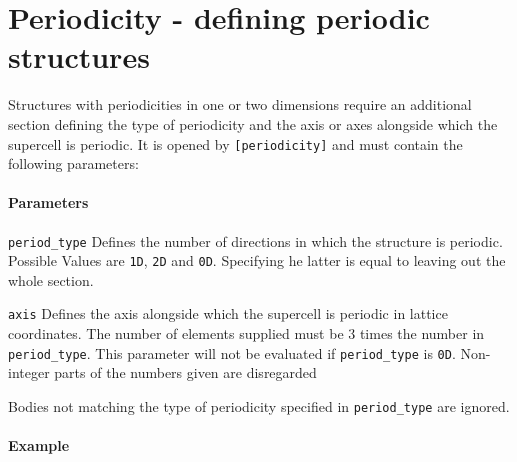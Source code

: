\section{Periodicity - defining periodic structures}
Structures with periodicities in one or two dimensions require an additional section defining the type of periodicity and the axis or axes alongside which the supercell is periodic. It is opened by \lstinline{[periodicity]} and must contain the following parameters:

\paragraph{Parameters}

\begin{description}
 \item{\lstinline{period_type}} Defines the number of directions in which the structure is periodic. Possible Values are \lstinline{1D}, \lstinline{2D} and \lstinline{0D}. Specifying he latter is equal to leaving out the whole section.
 \item{\lstinline{axis}} Defines the axis alongside which the supercell is periodic in lattice coordinates. The number of elements supplied must be 3 times the number in \lstinline{period_type}. This parameter will not be evaluated if \lstinline{period_type} is \lstinline{0D}. Non-integer parts of the numbers given are disregarded
\end{description}

Bodies not matching the type of periodicity specified in \lstinline{period_type} are ignored.

\paragraph{Example}\ 


